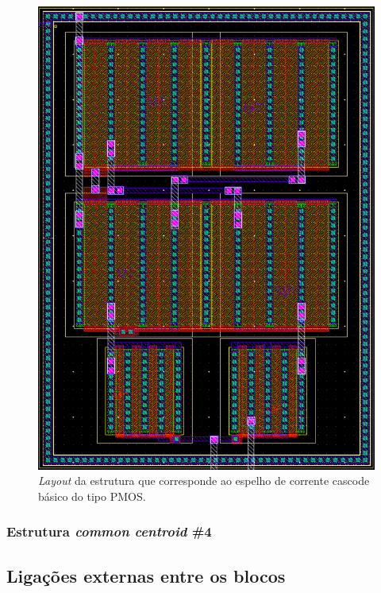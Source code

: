 \documentclass[11pt]{article}
\numberwithin{equation}{section}
\begin{document}
\begin{figure}[H]
	\centering
	\includegraphics[keepaspectratio=true, scale=0.57]{exps/layout/espelhodecorrenteamp}
	\vspace{-0.5em}
	\caption{\textit{Layout} da estrutura que corresponde ao espelho de corrente cascode básico do tipo PMOS.}
	\vspace{-0.8em}
\end{figure}

\subsubsection{Estrutura \textit{common centroid} \#4}

\subsection{Ligações externas entre os blocos}
\end{document}
